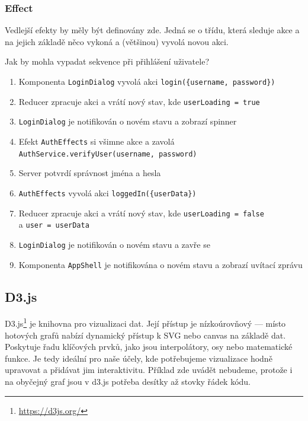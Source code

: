 \subsubsection*{Effect}

Vedlejší efekty by měly být definovány zde. Jedná se o třídu, která sleduje akce a na jejich základě něco vykoná a (většinou) vyvolá novou akci.

\begin{exmp}
  Jak by mohla vypadat sekvence při přihlášení uživatele?

  \begin{enumerate}
    \item Komponenta \/\lstinline|LoginDialog| vyvolá akci \/\lstinline|login({username, password})|
    \item Reducer zpracuje akci a vrátí nový stav, kde \/\lstinline|userLoading = true|
    \item \lstinline|LoginDialog| je notifikován o novém stavu a zobrazí spinner
    \item Efekt \/\lstinline|AuthEffects| si všimne akce a zavolá \\\lstinline|AuthService.verifyUser(username, password)|
    \item Server potvrdí správnost jména a hesla
    \item \lstinline|AuthEffects| vyvolá akci \/\lstinline|loggedIn({userData})|
    \item Reducer zpracuje akci a vrátí nový stav, kde \/\lstinline|userLoading = false|\\a \/\lstinline|user = userData|
    \item \lstinline|LoginDialog| je notifikován o novém stavu a zavře se
    \item Komponenta \/\lstinline|AppShell| je notifikována o novém stavu a zobrazí uvítací zprávu
  \end{enumerate}
\end{exmp}

\subsection{D3.js}

D3.js\footnote{\url{https://d3js.org/}} je knihovna pro vizualizaci dat. Její přístup je nízkoúrovňový --- místo hotových grafů nabízí dynamický přístup k SVG nebo canvas na základě dat. Poskytuje řadu klíčových prvků, jako jsou interpolátory, osy nebo matematické funkce. Je tedy ideální pro naše účely, kde potřebujeme vizualizace hodně upravovat a přidávat jim interaktivitu. Příklad zde uvádět nebudeme, protože i na obyčejný graf jsou v d3.js potřeba desítky až stovky řádek kódu.

